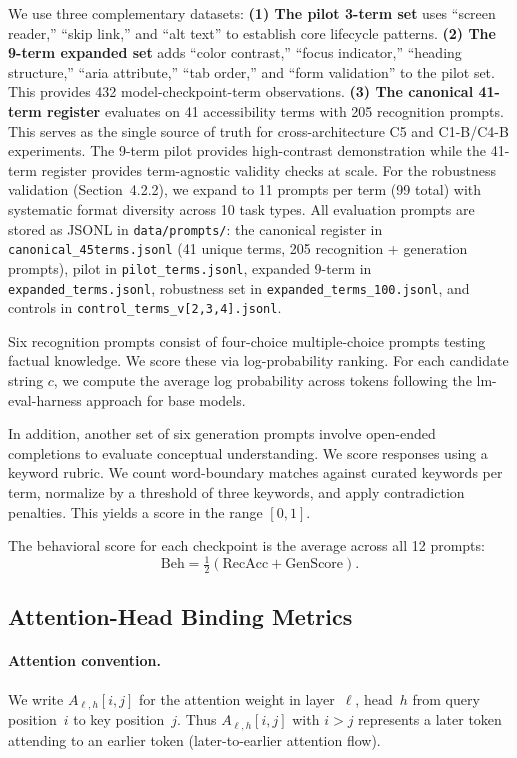 \documentclass[10pt]{article} %
\begin{document}
We use three complementary datasets:
\textbf{(1) The pilot 3-term set} uses ``screen reader,'' ``skip link,'' and ``alt text'' to establish core lifecycle patterns.
\textbf{(2) The 9-term expanded set} adds ``color contrast,'' ``focus indicator,'' ``heading structure,'' ``aria attribute,'' ``tab order,'' and ``form validation'' to the pilot set. This provides 432 model-checkpoint-term observations.
\textbf{(3) The canonical 41-term register} evaluates on 41 accessibility terms with 205 recognition prompts. This serves as the single source of truth for cross-architecture C5 and C1-B/C4-B experiments.
The 9-term pilot provides high-contrast demonstration while the 41-term register provides term-agnostic validity checks at scale.
For the robustness validation (Section~4.2.2), we expand to 11 prompts per term (99 total) with systematic format diversity across 10 task types.
All evaluation prompts are stored as JSONL in \texttt{data/prompts/}: the canonical register in \texttt{canonical\_45terms.jsonl} (41 unique terms, 205 recognition + generation prompts), pilot in \texttt{pilot\_terms.jsonl}, expanded 9-term in \texttt{expanded\_terms.jsonl}, robustness set in \texttt{expanded\_terms\_100.jsonl}, and controls in \texttt{control\_terms\_v{[2,3,4]}.jsonl}.

Six recognition prompts consist of four-choice multiple-choice prompts testing factual knowledge.
We score these via log-probability ranking. For each candidate string $c$, we compute the average log probability across tokens following the lm-eval-harness approach \citep{gao2021lmharness} for base models.

In addition, another set of six generation prompts involve open-ended completions to evaluate conceptual understanding.
We score responses using a keyword rubric. We count word-boundary matches against curated keywords per term, normalize by a threshold of three keywords, and apply contradiction penalties. This yields a score in the range $[0,1]$.

The behavioral score for each checkpoint is the average across all 12 prompts:
\[
\mathrm{Beh}=\tfrac{1}{2}(\mathrm{RecAcc}+\mathrm{GenScore}).
\]

\subsection{Attention-Head Binding Metrics}

\paragraph{Attention convention.}
We write $A_{\ell,h}[i,j]$ for the attention weight in layer~$\ell$, head~$h$ from query position~$i$ to key position~$j$.
Thus $A_{\ell,h}[i,j]$ with $i>j$ represents a later token attending to an earlier token (later-to-earlier attention flow).
\end{document}

